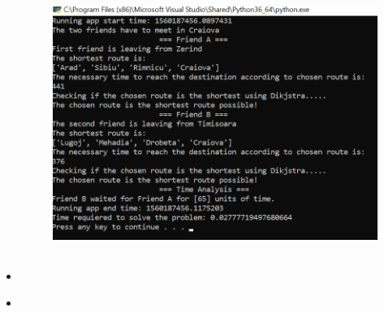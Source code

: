 \documentclass[12pt]{article}
\begin{document}
\begin{itemize}

	\item  \par




\begin{figure}[H]
	\begin{Center}
		\includegraphics[width=5.63in,height=4.04in]{./media/image3.png}
	\end{Center}
\end{figure}



	\item  \par





\end{itemize}
\end{document}
